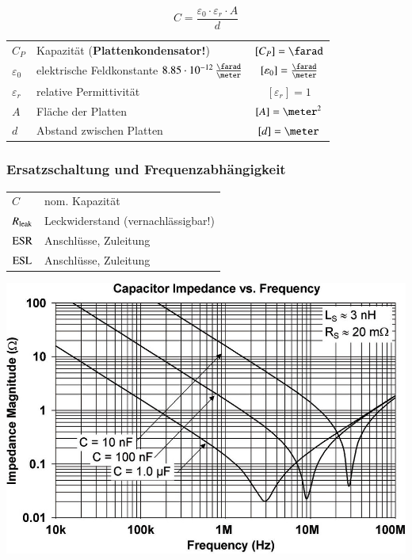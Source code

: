 \begin{minipage}[c]{0.20\columnwidth}
    $$ \boxed{C = \frac{\varepsilon_0 \cdot \varepsilon_r \cdot A}{d}} $$
\end{minipage}
\hfill
\begin{minipage}[c]{0.78\columnwidth}
    \begin{tabular}{llc}
        $C_P$           & Kapazität (\textbf{Plattenkondensator!})                                  & $[C_P] = \farad$ \\
        $\varepsilon_0$ & elektrische Feldkonstante $8.85 \cdot 10^{-12} \, \frac{\farad}{\meter}$  & $[\varepsilon_0] = \frac{\farad}{\meter}$ \\
        $\varepsilon_r$ & relative Permittivität                                                    & $[\varepsilon_r] = 1$ \\
        $A$             & Fläche der Platten                                                        & $[A] = \meter^2$ \\
        $d$             & Abstand zwischen Platten                                                  & $[d] = \meter$
    \end{tabular}
\end{minipage}


\subsubsection{Ersatzschaltung und Frequenzabhängigkeit}

\begin{minipage}[c]{0.52\columnwidth}
    

    \begin{tabular}{ll@{}}
        $C$             & nom. Kapazität  \\
        $R_{\rm leak}$  & Leckwiderstand (vernachlässigbar!) \\
        $\rm{ESR}$      & Anschlüsse, Zuleitung \\ 
        $\rm{ESL}$      & Anschlüsse, Zuleitung 
    \end{tabular}
\end{minipage}
\hfill
\begin{minipage}[c]{0.46\columnwidth}
    \includegraphics[width=\columnwidth]{images/realer_kondensator_frequenzverlauf.jpg}
\end{minipage}

